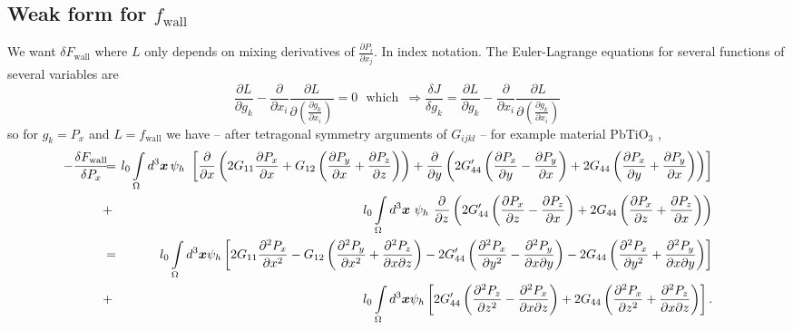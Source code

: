 \documentclass[16pt]{article} %
\begin{document}
\subsection{Weak form for $f_\mathrm{wall}$}
%
We want $\delta F_\mathrm{wall}$ where $L$ only depends on mixing derivatives of $\frac{\partial P_i}{\partial x_j}$.
%
In index notation. The Euler-Lagrange equations for several functions of several variables are
%
$$\frac{\partial L}{\partial g_{k}} - \frac{\partial}{\partial x_i}\frac{\partial L}{\partial \left( \frac{\partial g_k}{\partial x_i}\right)} = 0 \,\,\,\,\mathrm{which}\,\,\, \Rightarrow \frac{\delta J}{\delta g_k} = \frac{\partial L}{\partial g_{k}} - \frac{\partial}{\partial x_i}\frac{\partial L}{\partial \left( \frac{\partial g_k}{\partial x_i}\right)}  $$
%
so for $g_k = P_x$ and $L = f_\mathrm{wall}$ we have -- after tetragonal symmetry arguments of $G_{ijkl}$ -- for example material $\mathrm{PbTiO}_3$ \cite{Li2001}, 
%
\begin{eqnarray}\nonumber
\hspace{-15pt} -\frac{\delta F_\mathrm{wall}}{\delta P_x}\hspace{-5pt} &=&\hspace{-6pt} l_0 \int\limits_\Omega d^3 {\boldsymbol x} \,\psi_h \,\,\left[ \frac{\partial}{\partial x} \left(2 G_{11} \frac{\partial P_x}{\partial x} + G_{12} \left(\frac{\partial P_y}{\partial x} + \frac{\partial P_z}{\partial z} \right) \right) + \frac{\partial}{\partial y} \left(2 G_{44}' \left(\frac{\partial P_x}{\partial y} - \frac{\partial P_y}{\partial x} \right) + 2 G_{44} \left(\frac{\partial P_x}{\partial y} + \frac{\partial P_y}{\partial x} \right) \right) \right]\\ \nonumber
& +& l_0\int\limits_\Omega d^3 {\boldsymbol x} \,\, \psi_h \,\, \frac{\partial}{\partial z} \left( 2 G_{44}' \left(\frac{\partial P_x}{\partial z} - \frac{\partial P_z}{\partial x} \right) + 2 G_{44} \left(\frac{\partial P_x}{\partial z} + \frac{\partial P_z}{\partial x} \right)\right) \\ \nonumber
&=&\hspace{-8pt}  l_0 \int\limits_\Omega d^3 {\boldsymbol x} \psi_h \left[ 2 G_{11} \frac{\partial^2 P_x}{\partial x^2} - G_{12} \left(\frac{\partial^2 P_y}{\partial x^2} + \frac{\partial^2 P_z}{\partial x \partial z} \right) - 2 G'_{44} \left(\frac{\partial^2 P_x}{\partial y^2} - \frac{\partial^2 P_y}{\partial x \partial y}\right) - 2 G_{44} \left( \frac{\partial^2 P_x}{\partial y^2} + \frac{\partial^2 P_y}{\partial x \partial y} \right) \right] \\ \nonumber
&+&l_0 \int\limits_\Omega d^3 {\boldsymbol x} \psi_h \left[2 G_{44}' \left(\frac{\partial^2 P_z}{\partial z^2} - \frac{\partial^2 P_x}{\partial x \partial z} \right) + 2 G_{44} \left(\frac{\partial^2 P_x}{\partial z^2} + \frac{\partial^2 P_z}{\partial x \partial z} \right)\right]. \\ \nonumber
\end{eqnarray}
\end{document}
